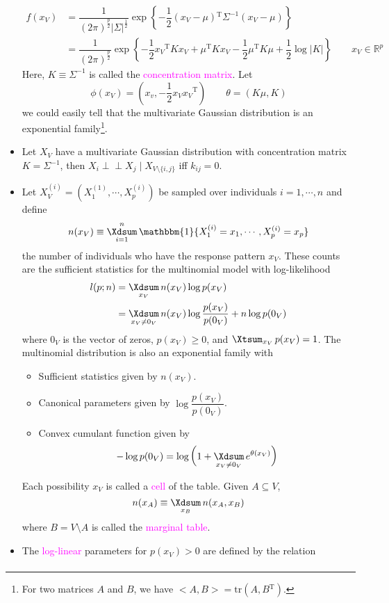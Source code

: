 \documentclass[UTF8]{book}
\DeclareMathOperator*{\Xsum}{\mathchoice{\Xdsum}{\Xtsum}{\Xtsum}{\Xtsum}}
\newcommand{\perpp}{\ensuremath{\perp\!\!\!\!\perp}}
\newcommand{\et}{&}
\newcommand{\concept}[1]{\textcolor{magenta}{#1}}
\renewcommand{\t}{\ensuremath{^\mathrm{T}}}
\begin{document}
\begin{itemize}
\begin{align*}
	f(x_V) \et = \dfrac{1}{(2\pi)^{\frac{p}{2}}|\Sigma|^{\frac{1}{2}}}\exp\left\{-\dfrac{1}{2}(x_V-\mu)\t\Sigma^{-1}(x_V-\mu)\right\}\\
	\et = \dfrac{1}{(2\pi)^{\frac{p}{2}}}\exp\left\{-\dfrac{1}{2}x_V\t Kx_V + \mu\t Kx_V - \dfrac{1}{2}\mu\t K\mu + \dfrac{1}{2}\log |K|\right\} \qquad x_V\in\mathbb{R}^p
\end{align*}
Here, $K\equiv\Sigma^{-1}$ is called the \concept{concentration matrix}. Let 
$$
\phi(x_V) = \left(x_v, -\dfrac{1}{2}x_Vx_V\t\right) \qquad \theta = (K\mu ,K)
$$
we could easily tell that the multivariate Gaussian distribution is an exponential family\footnote{For two matrices $A$ and $B$, we have $<A,B>=\mathrm{tr}(A,B\t)$.}.
\item Let $X_V$ have a multivariate Gaussian distribution with concentration matrix $K=\Sigma^{-1}$, then $X_i\perpp X_j\mid X_{V\setminus\{i,j\}}$ iff $k_{ij} = 0$.
\item Let $X_V^{(i)}=(X_1^{(1)},\cdots,X_p^{(i)})$ be sampled over individuals $i=1,\cdots , n$ and define
$$
n(x_V) \equiv \Xsum_{i=1}^n\mathbbm{1}\{X_1^{(i)}=x_1,\cdots,X_p^{(i)}=x_p\}
$$
the number of individuals who have the response pattern $x_V$. These counts are the sufficient statistics for the multinomial model with log-likelihood
\begin{align*}
	l(p; n)\et = \Xsum_{x_V}n(x_V)\log p(x_V)\\
	\et = \Xsum_{x_V\neq 0_V} n(x_V)\log\dfrac{p(x_V)}{p(0_V)} +n\log p(0_V)
\end{align*}
where $0_V$ is the vector of zeros, $p(x_V)\geq 0$, and $\Xsum_{x_V}p(x_V)=1$. The multinomial distribution is also an exponential family with
\begin{itemize}
	\item Sufficient statistics given by $n(x_V)$.
	\item Canonical parameters given by $\log\dfrac{p(x_V)}{p(0_V)}$.
	\item Convex cumulant function given by
	$$
		-\log p(0_V) = \log\left(1+\Xsum_{x_V\neq 0_V}e^{\theta (x_V)}\right)	
	$$
\end{itemize}
Each possibility $x_V$ is called a \concept{cell} of the table. Given $A\subseteq V$, 
$$
n(x_A)\equiv \Xsum_{x_B}n(x_A,x_B)
$$
where $B=V\setminus A$ is called the \concept{marginal table}.
\item The \concept{log-linear} parameters for $p(x_V)>0$ are defined by the relation
\begin{align*}

\end{align*}
\end{itemize}
\end{document}
